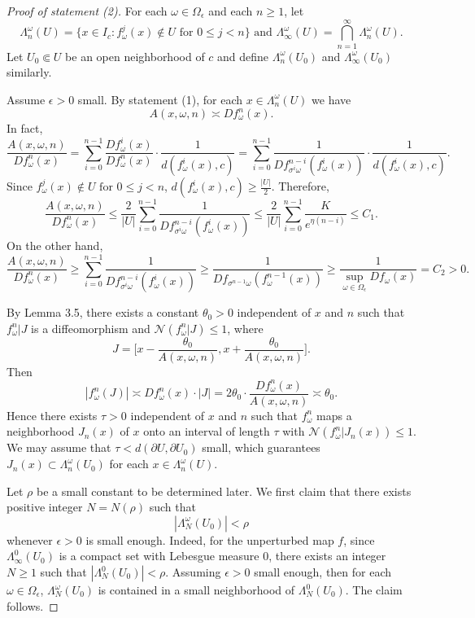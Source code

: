 \documentclass[11pt,oneside]{article}
\theoremstyle{plain}
\numberwithin{equation}{section}
\numberwithin{figure}{section}
\numberwithin{table}{section}
\begin{document}
\begin{proof}[Proof of statement (2)]

For each $\omega \in \Omega_{\epsilon}$ and each $n \geq 1$, let
\[
\Lambda_n^{\omega} (U) = \{x\in I_c : f_{\omega}^j(x) \notin U \text{ for } 0 \leq j <n \} \mbox{ and \ } 
\Lambda_{\infty}^{\omega} (U) = \bigcap_{n=1}^{\infty} \Lambda_n^{\omega} (U).
\]
Let $U_0 \Subset U$ be an open neighborhood of $c$ and define $\Lambda_n^{\omega} (U_0)$ and $\Lambda_{\infty}^{\omega} (U_0)$ similarly.


Assume $\epsilon >0$ small. By statement (1), for each $x \in \Lambda_n^{\omega} (U)$ we have
\[
A(x, \omega, n) \asymp D f_{\omega}^n (x).
\]
In fact,  
\[
\frac{A(x, \omega, n)}{D f_{\omega}^n (x)} = \sum_{i=0}^{n-1} \frac{Df_{\omega}^i(x)}{D f_{\omega}^n (x)} \cdot \frac{1}{d(f_{\omega}^i(x), c)} = \sum_{i=0}^{n-1} \frac{1}{D f_{\sigma^i \omega}^{n-i} (f_{\omega}^i (x))} \cdot \frac{1}{d(f_{\omega}^i(x), c)}.
\]
Since $f_{\omega}^j(x) \notin U \text{ for } 0 \leq j <n$, $d(f_{\omega}^i(x), c) \geq \frac{|U|}{2}$. Therefore,
\[
\frac{A(x, \omega, n)}{D f_{\omega}^n (x)} \leq \frac{2}{|U|} \sum_{i=0}^{n-1} \frac{1}{D f_{\sigma^i \omega}^{n-i} (f_{\omega}^i(x))} \leq \frac{2}{|U|} \sum_{i=0}^{n-1} \frac{K}{e^{\eta(n-i)}} \leq C_1.
\]
On the other hand,
\[
\frac{A(x, \omega, n)}{D f_{\omega}^n (x)} \geq \sum_{i=0}^{n-1} \frac{1}{D f_{\sigma^i \omega}^{n-i} (f_{\omega}^i(x))} \geq \frac{1}{D f_{\sigma^{n-1} \omega} ( f_{\omega}^{n-1} (x))} \geq \frac{1}{\sup_{\omega \in \Omega_{\epsilon}} Df_{\omega}(x)} = C_2 > 0.
\]


By Lemma 3.5, there exists a constant $\theta_0 >0$ independent of $x$ and $n$ such that $f_{\omega}^n | J$ is a diffeomorphism and $\mathcal N(f_{\omega}^n | J) \leq 1$, where 
\[
J =  \bigg[ x - \frac{\theta_0}{A(x, \omega, n)}, x + \frac{\theta_0}{A(x, \omega, n)} \bigg].
\]
Then
\[
|f_{\omega}^n (J)| \asymp Df_{\omega}^n (x) \cdot |J| = 2 \theta_0 \cdot \frac{Df_{\omega}^n (x)}{A(x, \omega, n)} \asymp \theta_0.
\]
Hence there exists $\tau >0$ independent of $x$ and $n$ such that $f_{\omega}^n$ maps a neighborhood $J_n(x)$ of $x$ onto an interval of length $\tau$ with $\mathcal N(f_{\omega}^n | J_n(x)) \leq 1$. We may assume that $\tau < d(\partial U, \partial U_0)$ small, which guarantees $J_n(x) \subset \Lambda_n^{\omega} (U_0)$ for each $x \in \Lambda_n^{\omega}(U)$.


Let $\rho$ be a small constant to be determined later. We first claim that there exists positive integer $N = N(\rho)$ such that 
\[
| \Lambda_N^{\omega}(U_0)| < \rho
\]
whenever $\epsilon>0$ is small enough. Indeed, for the unperturbed map $f$, since $\Lambda_{\infty}^{0}(U_0)$ is a compact set with Lebesgue measure $0$, there exists an integer $N \geq 1$ such that $|\Lambda_{N}^{0}(U_0)|< \rho$. Assuming $\epsilon >0$ small enough, then for each $\omega \in \Omega_{\epsilon}$, $ \Lambda_N^{\omega}(U_0)$ is contained in a small neighborhood of  $\Lambda_N^{0}(U_0)$. The claim follows.



\end{proof}
\end{document}
